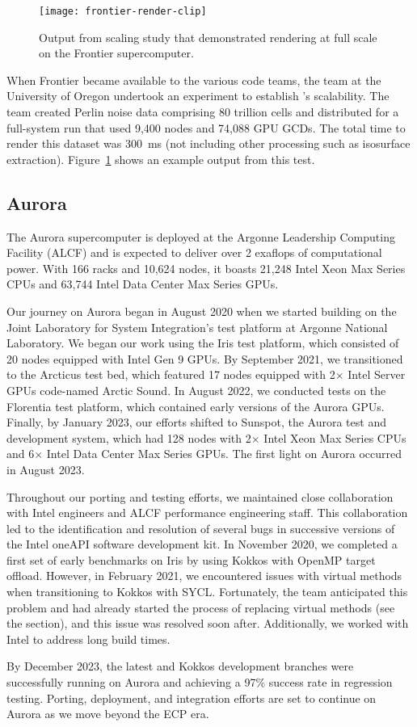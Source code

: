 \begin{figure}[htb]
  \texttt{[image: frontier-render-clip]}
  \caption{
    Output from \vtkm scaling study that demonstrated rendering at full scale on the Frontier supercomputer.
  }
  \label{fig:frontier-render}
\end{figure}

When Frontier became available to the various code teams, the \vtkm team at the University of Oregon undertook an experiment to establish \vtkm's scalability.
The team created Perlin noise data comprising 80 trillion cells and distributed for a full-system run that used 9,400 nodes and 74,088 GPU GCDs.
The total time to render this dataset was 300~ms (not including other processing such as isosurface extraction).
Figure~\ref{fig:frontier-render} shows an example output from this test.


\subsection{Aurora}


The Aurora supercomputer is deployed at the Argonne Leadership Computing Facility (ALCF) and is expected to deliver over 2 exaflops of computational power. With 166 racks and 10,624 nodes, it boasts 21,248 Intel Xeon Max Series CPUs and 63,744 Intel Data Center Max Series GPUs.

Our journey on Aurora began in August 2020 when we started building \vtkm on the Joint Laboratory for System Integration's test platform at Argonne National Laboratory.
We began our work using the Iris test platform, which consisted of 20 nodes equipped with Intel Gen 9 GPUs.
By September 2021, we transitioned to the Arcticus test bed, which featured 17 nodes equipped with 2$\times$ Intel Server GPUs code-named Arctic Sound.
In August 2022, we conducted tests on the Florentia test platform, which contained early versions of the Aurora GPUs.
Finally, by January 2023, our efforts shifted to Sunspot, the Aurora test and development system, which had 128 nodes with 2$\times$ Intel Xeon Max Series CPUs and 6$\times$ Intel Data Center Max Series GPUs.
The first light on Aurora occurred in August 2023.

Throughout our porting and testing efforts, we maintained close collaboration with Intel engineers and ALCF performance engineering staff. This collaboration led to the identification and resolution of several bugs in successive versions of the Intel oneAPI software development kit. In November 2020, we completed a first set of early \vtkm benchmarks on Iris by using Kokkos with OpenMP target offload. However, in February 2021, we encountered issues with virtual methods when transitioning to Kokkos with SYCL. Fortunately, the team anticipated this problem and had already started the process of replacing virtual methods (see the  section), and this issue was resolved soon after. Additionally, we worked with Intel to address long build times.

By December 2023, the latest \vtkm and Kokkos development branches were successfully running on Aurora and achieving a 97\% success rate in regression testing. Porting, deployment, and integration efforts are set to continue on Aurora as we move beyond the ECP era.
